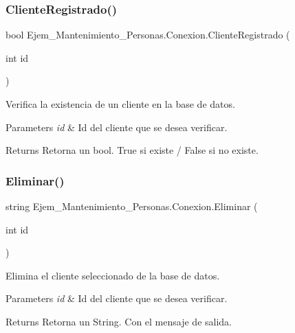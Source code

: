 \subsubsection{\texorpdfstring{Cliente\+Registrado()}{ClienteRegistrado()}}
{\footnotesize\ttfamily bool Ejem\+\_\+\+Mantenimiento\+\_\+\+Personas.\+Conexion.\+Cliente\+Registrado (\begin{DoxyParamCaption}\item[{int}]{id }\end{DoxyParamCaption})}



Verifica la existencia de un cliente en la base de datos. 


\begin{DoxyParams}{Parameters}
{\em id} & Id del cliente que se desea verificar.\\
\hline
\end{DoxyParams}
\begin{DoxyReturn}{Returns}
Retorna un bool. True si existe / False si no existe.
\end{DoxyReturn}
\mbox{\label{class_ejem___mantenimiento___personas_1_1_conexion_a97b8be1c8c50cfb4d2f0babd96567262}} 
\subsubsection{\texorpdfstring{Eliminar()}{Eliminar()}}
{\footnotesize\ttfamily string Ejem\+\_\+\+Mantenimiento\+\_\+\+Personas.\+Conexion.\+Eliminar (\begin{DoxyParamCaption}\item[{int}]{id }\end{DoxyParamCaption})}



Elimina el cliente seleccionado de la base de datos. 


\begin{DoxyParams}{Parameters}
{\em id} & Id del cliente que se desea verificar.\\
\hline
\end{DoxyParams}
\begin{DoxyReturn}{Returns}
Retorna un String. Con el mensaje de salida.
\end{DoxyReturn}
\mbox{\label{class_ejem___mantenimiento___personas_1_1_conexion_a8f2099b092af61b02fa7b96c491fe1f5}} 
